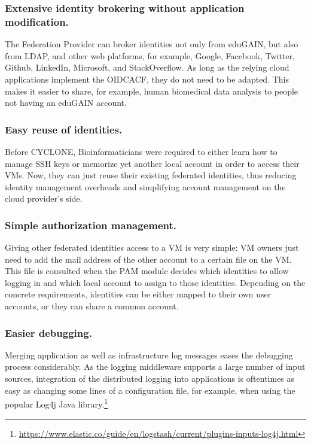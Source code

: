 \documentclass{llncs}
\begin{document}
\subsubsection{Extensive identity brokering without application modification.}

The Federation Provider can broker identities not only from eduGAIN, but also from LDAP, and other web platforms, for example, Google, Facebook, Twitter, Github, LinkedIn, Microsoft, and StackOverflow. As long as the relying cloud applications implement the OIDCACF, they do not need to be adapted. This makes it easier to share, for example, human biomedical data analysis to people not having an eduGAIN account.

\subsubsection{Easy reuse of identities.} Before CYCLONE, Bioinformaticians were required to either learn how to manage SSH keys or memorize yet another local account in order to access their VMs. Now, they can just reuse their existing federated identities, thus reducing identity management overheads and simplifying account management on the cloud provider's side.

\subsubsection{Simple authorization management.} Giving other federated identities access to a VM is very simple: VM owners just need to add the mail address of the other account to a certain file on the VM. This file is consulted when the PAM module decides which identities to allow logging in and which local account to assign to those identities. Depending on the concrete requirements, identities can be either mapped to their own user accounts, or they can share a common account.

\subsubsection{Easier debugging.} Merging application as well as infrastructure log messages eases the debugging process considerably. As the logging middleware supports a large number of input sources, integration of the distributed logging into applications is oftentimes as easy as changing some lines of a configuration file, for example, when using the popular Log4j Java library.\footnote{\url{https://www.elastic.co/guide/en/logstash/current/plugins-inputs-log4j.html}}
\end{document}
